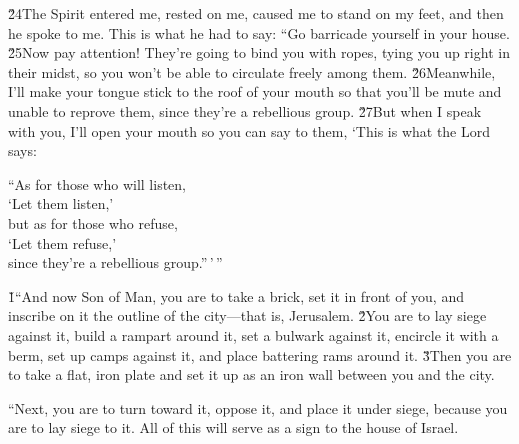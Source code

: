 \v{24}The Spirit entered me, rested on me, caused me to stand on my feet, and then he spoke to me. This is what he had to say: ``Go barricade yourself in your house. \v{25}Now pay attention! They're going to bind you with ropes, tying you up right in their midst, so you won't be able to circulate freely among them. \v{26}Meanwhile, I'll make your tongue stick to the roof of your mouth so that you'll be mute and unable to reprove them, since they're a rebellious group. \v{27}But when I speak with you, I'll open your mouth so you can say to them, `This is what the Lord  says:

\begin{poetry}
\poeml ``As for those who will listen, \\
\poemll    `Let them listen,' \\
\poeml but as for those who refuse, \\
\poemll    `Let them refuse,' \\
\poemlll       since they're a rebellious group.''\,'\,''
\end{poetry}

\v{1}``And now Son of Man, you are to take a brick, set it in front of you, and inscribe on it the outline of the city---that is, Jerusalem. \v{2}You are to lay siege against it, build a rampart around it, set a bulwark against it, encircle it with a berm, set up camps against it, and place battering rams around it. \v{3}Then you are to take a flat, iron plate and set it up as an iron wall between you and the city.

``Next, you are to turn toward it, oppose it, and place it under siege, because you are to lay siege to it. All of this will serve as a sign to the house of Israel.

